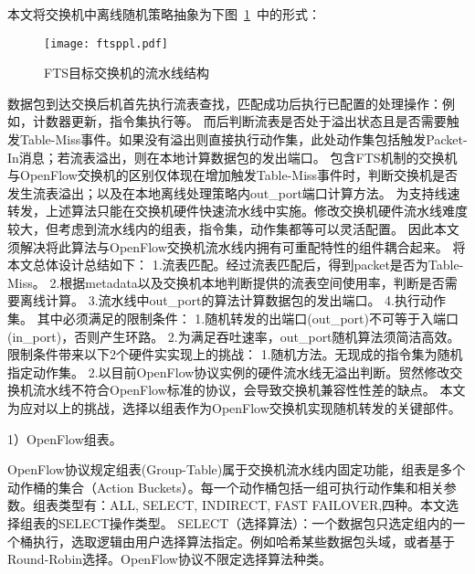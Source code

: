 


本文将交换机中离线随机策略抽象为下图~\ref{fig:ftsppl}~中的形式：

\begin{figure}[!ht]
	\vspace{-1.5mm}
	\centering 
	\texttt{[image: ftsppl.pdf]}
	\caption{FTS目标交换机的流水线结构} \label{fig:ftsppl}
\end{figure}


数据包到达交换后机首先执行流表查找，匹配成功后执行已配置的处理操作：例如，计数器更新，指令集执行等。
而后判断流表是否处于溢出状态且是否需要触发Table-Miss事件。如果没有溢出则直接执行动作集，此处动作集包括触发Packet-In消息；若流表溢出，则在本地计算数据包的发出端口。%
包含FTS机制的交换机与OpenFlow交换机的区别仅体现在增加触发Table-Miss事件时，判断交换机是否发生流表溢出；以及在本地离线处理策略内out\_port端口计算方法。
为支持线速转发，上述算法只能在交换机硬件快速流水线中实施。修改交换机硬件流水线难度较大，但考虑到流水线内的组表，指令集，动作集都等可以灵活配置。
因此本文须解决将此算法与OpenFlow交换机流水线内拥有可重配特性的组件耦合起来。
将本文总体设计总结如下：
1.流表匹配。经过流表匹配后，得到packet是否为Table-Miss。 
2.根据metadata以及交换机本地判断提供的流表空间使用率，判断是否需要离线计算。
3.流水线中out\_port的算法计算数据包的发出端口。
4.执行动作集。
其中必须满足的限制条件：
1.随机转发的出端口(out\_port)不可等于入端口(in\_port)，否则产生环路。
2.为满足吞吐速率，out\_port随机算法须简洁高效。
限制条件带来以下2个硬件实实现上的挑战：
1.随机方法。无现成的指令集为随机指定动作集。
2.以目前OpenFlow协议实例的硬件流水线无溢出判断。贸然修改交换机流水线不符合OpenFlow标准的协议，会导致交换机兼容性性差的缺点。
本文为应对以上的挑战，选择以组表作为OpenFlow交换机实现随机转发的关键部件。




1）OpenFlow组表。

OpenFlow协议规定组表(Group-Table)属于交换机流水线内固定功能，组表是多个动作桶的集合（Action Buckets）。每一个动作桶包括一组可执行动作集和相关参数。组表类型有：ALL, SELECT, INDIRECT, FAST FAILOVER,四种。本文选择组表的SELECT操作类型。
SELECT（选择算法）：一个数据包只选定组内的一个桶执行，选取逻辑由用户选择算法指定。例如哈希某些数据包头域，或者基于Round-Robin选择。OpenFlow协议不限定选择算法种类。

